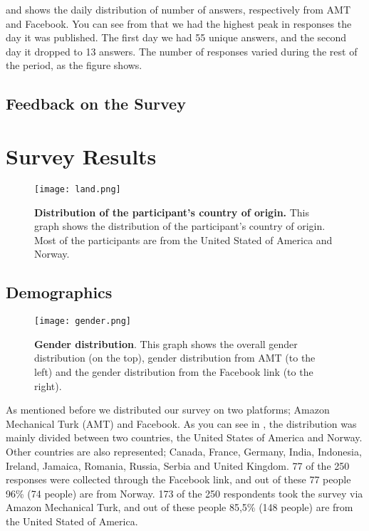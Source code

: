  and  shows the daily distribution of number of answers, respectively from AMT and Facebook. You can see from  that we had the highest peak in responses the day it was published. The first day we had 55 unique answers, and the second day it dropped to 13 answers. The number of responses varied during the rest of the period, as the figure shows. 

\subsection{Feedback on the Survey}







\section{Survey Results}

\begin{figure}[h!]
\centering
\texttt{[image: land.png]}
\caption[Distribution of the participant's country of origin]{\textbf{Distribution of the participant's country of origin.} This graph shows the distribution of the participant's country of origin. Most of the participants are from the United Stated of America and Norway.} 
\label{fig:land}
\end{figure}


\subsection{Demographics}

\begin{figure}[h!]
\centering
\texttt{[image: gender.png]}
\caption[Gender distribution]{\textbf{Gender distribution}. This graph shows the overall gender distribution (on the top), gender distribution from AMT (to the left) and the gender distribution from the Facebook link (to the right).} 
\label{fig:gender}
\end{figure}

As mentioned before we distributed our survey on two platforms; Amazon Mechanical Turk (AMT) and Facebook. As you can see in , the distribution was mainly divided between two countries, the United States of America and Norway. Other countries are also represented; Canada, France, Germany, India, Indonesia, Ireland, Jamaica, Romania, Russia, Serbia and United Kingdom. 77 of the 250 responses were collected through the Facebook link, and out of these 77 people 96\% (74 people) are from Norway. 173 of the 250 respondents took the survey via Amazon Mechanical Turk, and out of these people 85,5\% (148 people) are from the United Stated of America. 

